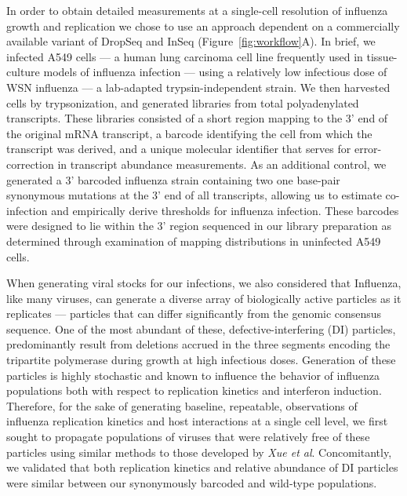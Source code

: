 \documentclass[9pt,lineno]{elife}
\begin{document}
	In order to obtain detailed measurements at a single-cell resolution of influenza growth and replication we chose to use an approach dependent on a commercially available variant of DropSeq and InSeq (Figure~\ref{fig:workflow}A). In brief, we infected A549 cells --- a human lung carcinoma cell line frequently used in tissue-culture models of influenza infection --- using a relatively low infectious dose of WSN influenza --- a lab-adapted trypsin-independent strain. We then harvested cells by trypsonization, and generated libraries from total polyadenylated transcripts. These libraries consisted of a short region mapping to the 3' end of the original mRNA transcript, a barcode identifying the cell from which the transcript was derived, and a unique molecular identifier that serves for error-correction in transcript abundance measurements. As an additional control, we generated a 3' barcoded influenza strain containing two one base-pair synonymous mutations at the 3' end of all transcripts, allowing us to estimate co-infection and empirically derive thresholds for influenza infection. These barcodes were designed to lie within the 3' region sequenced in our library preparation as determined through examination of mapping distributions in uninfected A549 cells.
	
        	When generating viral stocks for our infections, we also considered that Influenza, like many viruses, can generate a diverse array of biologically active particles as it replicates --- particles that can differ significantly from the genomic consensus sequence. One of the most abundant of these, defective-interfering (DI) particles, predominantly result from deletions accrued in the three segments encoding the tripartite polymerase during growth at high infectious doses. Generation of these particles is highly stochastic and known to influence the behavior of influenza populations both with respect to replication kinetics and interferon induction. Therefore, for the sake of generating baseline, repeatable, observations of influenza replication kinetics and host interactions at a single cell level, we first sought to propagate populations of viruses that were relatively free of these particles using similar methods to those developed by \textit{Xue et al}. Concomitantly, we validated that both replication kinetics and relative abundance of DI particles were similar between our synonymously barcoded and wild-type populations. 
	
\end{document}
